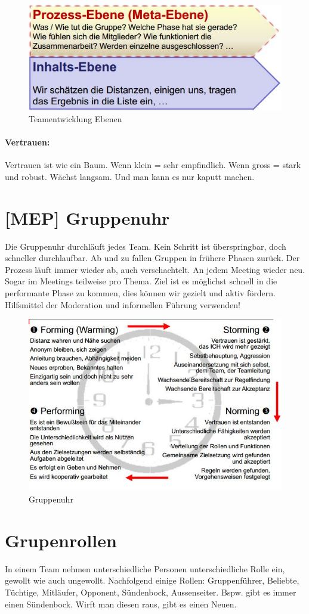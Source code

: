 \begin{figure}[h!]
\centering
\includegraphics[width=0.5\linewidth]{fig/teamentwicklung-metaebene}
\caption{Teamentwicklung Ebenen}
\label{fig:teamentwicklung-metaebene}
\end{figure}

\paragraph{Vertrauen:} Vertrauen ist wie ein Baum. Wenn klein = sehr empfindlich. Wenn gross = stark und robust. Wächst langsam. Und man kann es nur kaputt machen.

\section{[MEP] Gruppenuhr}
Die Gruppenuhr durchläuft jedes Team. Kein Schritt ist überspringbar, doch schneller durchlaufbar. Ab und zu fallen Gruppen in frühere Phasen zurück. Der Prozess läuft immer wieder ab, auch verschachtelt. An jedem Meeting wieder neu. Sogar im Meetings teilweise pro Thema. Ziel ist es möglichst schnell in die performante Phase zu kommen, dies können wir gezielt und aktiv fördern. Hilfsmittel der Moderation und informellen Führung verwenden!

\begin{figure}[h!]
\centering
\includegraphics[width=0.7\linewidth]{fig/teamentwicklung-gruppenuhr}
\caption{Gruppenuhr}
\label{fig:teamentwicklung-gruppenuhr}
\end{figure}

\section{Grupenrollen}
In einem Team nehmen unterschiedliche Personen unterschiedliche Rolle ein, gewollt wie auch ungewollt. Nachfolgend einige Rollen: Gruppenführer, Beliebte, Tüchtige, Mitläufer, Opponent, Sündenbock, Aussenseiter. Bspw. gibt es immer einen Sündenbock. Wirft man diesen raus, gibt es einen Neuen.

